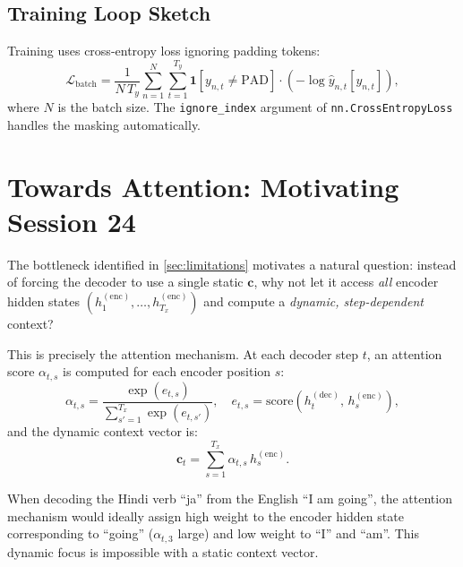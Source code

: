 \documentclass[12pt,a4paper]{article}
\begin{document}
\subsection{Training Loop Sketch}

Training uses cross-entropy loss ignoring padding tokens:
\begin{equation}
  \mathcal{L}_{\text{batch}} = \frac{1}{N\,T_y}
    \sum_{n=1}^{N}\sum_{t=1}^{T_y}
    \mathbf{1}[y_{n,t} \neq \text{PAD}]\cdot
    \left(-\log \hat{y}_{n,t}[y_{n,t}]\right),
  \label{eq:masked_loss}
\end{equation}
where $N$ is the batch size. The \texttt{ignore\_index} argument of
\texttt{nn.CrossEntropyLoss} handles the masking automatically.

\section{Towards Attention: Motivating Session 24}
\label{sec:towards_attention}

The bottleneck identified in \cref{sec:limitations} motivates a natural question: instead of
forcing the decoder to use a single static $\mathbf{c}$, why not let it access \emph{all}
encoder hidden states $(h_1^{(\text{enc})}, \ldots, h_{T_x}^{(\text{enc})})$ and compute a
\emph{dynamic, step-dependent} context?

This is precisely the attention mechanism. At each decoder step $t$, an attention score
$\alpha_{t,s}$ is computed for each encoder position $s$:
\begin{equation}
  \alpha_{t,s} = \frac{\exp(e_{t,s})}{\sum_{s'=1}^{T_x}\exp(e_{t,s'})},
  \quad e_{t,s} = \text{score}\!\left(h_t^{(\text{dec})},\, h_s^{(\text{enc})}\right),
  \label{eq:attention}
\end{equation}
and the dynamic context vector is:
\begin{equation}
  \mathbf{c}_t = \sum_{s=1}^{T_x} \alpha_{t,s}\,h_s^{(\text{enc})}.
  \label{eq:dynamic_context}
\end{equation}

\begin{example}[title={Attention in translation}]
  When decoding the Hindi verb ``ja'' from the English ``I am going'', the attention mechanism
  would ideally assign high weight to the encoder hidden state corresponding to ``going''
  ($\alpha_{t,3}$ large) and low weight to ``I'' and ``am''. This dynamic focus is impossible
  with a static context vector.
\end{example}
\end{document}
